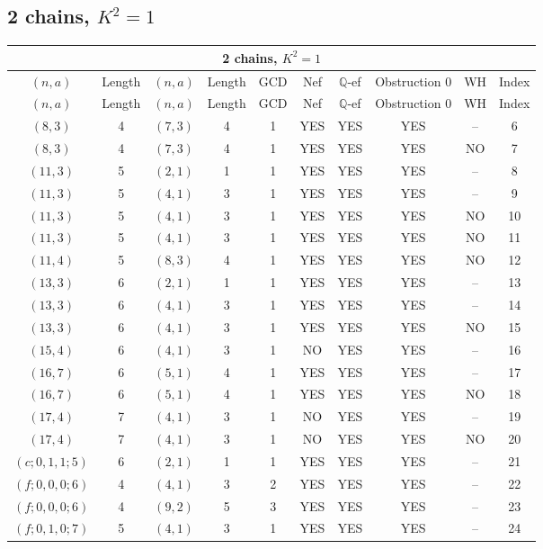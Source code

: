\subsection{2 chains, $K^2 = 1$}
\begin{longtable}{|c|c|c|c|c|c|c|c|c|c|}
\hline
\multicolumn{10}{|c|}{2 chains, $K^2 = 1$}\\
\hline
$(n,a)$ & Length & $(n,a)$ & Length & GCD & Nef & $\mathbb Q$-ef & Obstruction 0 & WH & Index\\
\hline
\endfirsthead

\hline
$(n,a)$ & Length & $(n,a)$ & Length & GCD & Nef & $\mathbb Q$-ef & Obstruction 0 & WH & Index\\
\hline
\endhead
\hline
\endfoot

$(8, 3)$ & 4 & $(7, 3)$ & 4 & 1 & YES & YES & YES & -- & 6\\
$(8, 3)$ & 4 & $(7, 3)$ & 4 & 1 & YES & YES & YES & NO & 7\\
$(11, 3)$ & 5 & $(2, 1)$ & 1 & 1 & YES & YES & YES & -- & 8\\
$(11, 3)$ & 5 & $(4, 1)$ & 3 & 1 & YES & YES & YES & -- & 9\\
$(11, 3)$ & 5 & $(4, 1)$ & 3 & 1 & YES & YES & YES & NO & 10\\
$(11, 3)$ & 5 & $(4, 1)$ & 3 & 1 & YES & YES & YES & NO & 11\\
$(11, 4)$ & 5 & $(8, 3)$ & 4 & 1 & YES & YES & YES & NO & 12\\
$(13, 3)$ & 6 & $(2, 1)$ & 1 & 1 & YES & YES & YES & -- & 13\\
$(13, 3)$ & 6 & $(4, 1)$ & 3 & 1 & YES & YES & YES & -- & 14\\
$(13, 3)$ & 6 & $(4, 1)$ & 3 & 1 & YES & YES & YES & NO & 15\\
$(15, 4)$ & 6 & $(4, 1)$ & 3 & 1 & NO & YES & YES & -- & 16\\
$(16, 7)$ & 6 & $(5, 1)$ & 4 & 1 & YES & YES & YES & -- & 17\\
$(16, 7)$ & 6 & $(5, 1)$ & 4 & 1 & YES & YES & YES & NO & 18\\
$(17, 4)$ & 7 & $(4, 1)$ & 3 & 1 & NO & YES & YES & -- & 19\\
$(17, 4)$ & 7 & $(4, 1)$ & 3 & 1 & NO & YES & YES & NO & 20\\
$(c; 0, 1, 1; 5)$ & 6 & $(2, 1)$ & 1 & 1 & YES & YES & YES & -- & 21\\
$(f; 0, 0, 0; 6)$ & 4 & $(4, 1)$ & 3 & 2 & YES & YES & YES & -- & 22\\
$(f; 0, 0, 0; 6)$ & 4 & $(9, 2)$ & 5 & 3 & YES & YES & YES & -- & 23\\
$(f; 0, 1, 0; 7)$ & 5 & $(4, 1)$ & 3 & 1 & YES & YES & YES & -- & 24
\end{longtable}
